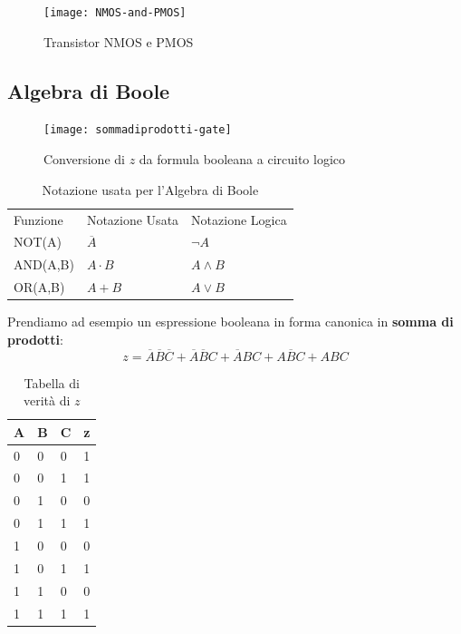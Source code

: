 \begin{figure}
	\centering
	\caption{Transistor NMOS e PMOS}
	\texttt{[image: NMOS-and-PMOS]}
\end{figure}

\clearpage

\subsection{Algebra di Boole}


\begin{figure}[H]
	\centering
	\texttt{[image: sommadiprodotti-gate]}
	\caption{Conversione di $ z $ da formula booleana a circuito logico}
\end{figure}

\begin{table}[H]
	\centering
	\caption{Notazione usata per l'Algebra di Boole}
	\label{tab:notazione-booleana}
	\begin{tabular}{|l|l|l|}
		\hline
		Funzione & Notazione Usata & Notazione Logica \\ 
		NOT(A)   & $\overbar{A}$   & $\lnot A$        \\ 
		AND(A,B) & $A \cdot B$     & $A \land B$      \\ 
		OR(A,B)  & $A + B$         & $A \lor B$       \\ \hline
	\end{tabular}
\end{table}

Prendiamo ad esempio un espressione booleana in forma canonica in \textbf{somma di prodotti}:
\[ z = \overbar{A}\overbar{B}\overbar{C} + \overbar{A}\overbar{B}C + \overbar{A}BC + A\overbar{B}C + ABC \]


\begin{table}[H]
	\centering
	\caption{Tabella di verità di $ z $}
	\label{tab:z-truth}
	\begin{tabular}{|l|l|l|l|}
		\hline
		A & B & C & z \\ \hline
		0                       & 0                      & 0 & 1 \\  
		0                       & 0                      & 1 & 1 \\ 
		0                       & 1                      & 0 & 0 \\ 
		0                       & 1                      & 1 & 1 \\ 
		1                       & 0                      & 0 & 0 \\ 
		1                       & 0                      & 1 & 1 \\  
		1                       & 1                      & 0 & 0 \\ 
		1                       & 1                      & 1 & 1 \\ \hline
	\end{tabular}
\end{table}




